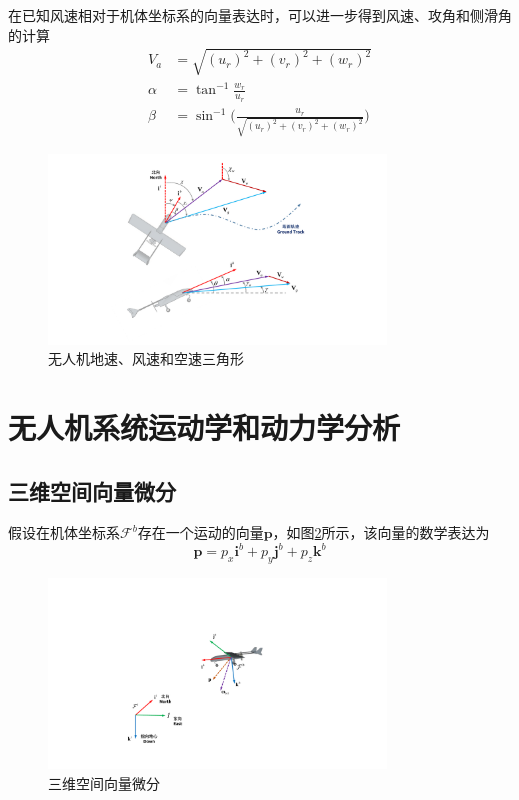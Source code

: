 在已知风速相对于机体坐标系的向量表达时，可以进一步得到风速、攻角和侧滑角的计算
\begin{align}
V_a &= \sqrt{(u_r)^2+(v_r)^2+(w_r)^2} \\
\alpha &=  \tan^{-1}\frac{w_r}{u_r}  \\
\beta  &=  \sin^{-1} \big( \frac{u_r}{\sqrt{(u_r)^2+(v_r)^2+(w_r)^2}} \big)
\end{align}

\begin{figure}[htb]   
	\centering
	\includegraphics[width=0.8\textwidth]{figs/chp02/chp02_04_uav_wind_frame.pdf}
	\caption{无人机地速、风速和空速三角形}
	\label{fig:chp02_04_uav_wind_frame}
\end{figure}

 




\section{无人机系统运动学和动力学分析}
\subsection{三维空间向量微分}
假设在机体坐标系$\mathcal{F}^b$存在一个运动的向量$\mathbf{p}$，如图\ref{fig:chp02_06_vector_rotation}所示，该向量的数学表达为 
\begin{equation}
\mathbf{p }= p_x \mathbf{i}^b +  p_y \mathbf{j}^b +  p_z \mathbf{k}^b
\end{equation}
\begin{figure}[htb]   
	\centering
	\includegraphics[width=0.8\textwidth]{figs/chp02/chp02_06_vector_rotation.pdf}
	\caption{三维空间向量微分}
	\label{fig:chp02_06_vector_rotation}
\end{figure}

